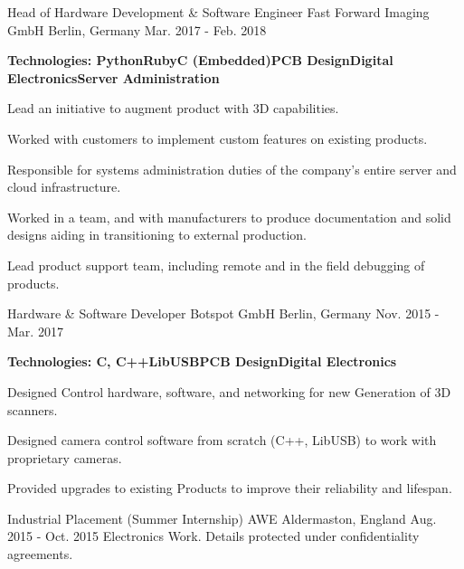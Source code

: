 \documentclass[11pt, a4paper]{awesome-cv}
\begin{document}
\begin{cventries}
  \cventry
    {Head of Hardware Development \& Software Engineer} %
    {Fast Forward Imaging GmbH} %
    {Berlin, Germany} %
    {Mar. 2017 - Feb. 2018} %
    {\begin{cvitems} %
        \item {\textbf{Technologies: Python{\enskip\cdotp\enskip}Ruby{\enskip\cdotp\enskip}C (Embedded){\enskip\cdotp\enskip}PCB Design{\enskip\cdotp\enskip}Digital Electronics{\enskip\cdotp\enskip}Server Administration}}
        \item {Lead an initiative to augment product with 3D capabilities.}
        \item {Worked with customers to implement custom features on existing products.}
        \item {Responsible for systems administration duties of the company's entire server and cloud infrastructure.}
        \item {Worked in a team, and with manufacturers to produce documentation and solid designs aiding in transitioning to external production.}
        \item {Lead product support team, including remote and in the field debugging of products.}
      \end{cvitems} 
     }

  \cventry
    {Hardware \& Software Developer} %
    {Botspot GmbH} %
    {Berlin, Germany} %
    {Nov. 2015 - Mar. 2017} %
    {\begin{cvitems} %
         \item {\textbf{Technologies: C, C++{\enskip\cdotp\enskip}LibUSB{\enskip\cdotp\enskip}PCB Design{\enskip\cdotp\enskip}Digital Electronics}}
        \item {Designed Control hardware, software, and networking for new Generation of 3D scanners.}
        \item {Designed camera control software from scratch (C++, LibUSB) to work with proprietary cameras.}
        \item {Provided upgrades to existing Products to improve their reliability and lifespan.}
      \end{cvitems}
    }

  \cventry
    {Industrial Placement (Summer Internship)} %
    {AWE} %
    {Aldermaston, England} %
    {Aug. 2015 - Oct. 2015} %
    {Electronics Work. Details protected under confidentiality agreements.}   
\end{cventries}
\end{document}
